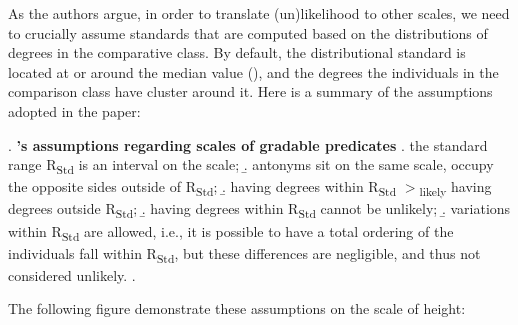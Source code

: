 \documentclass[12pt,letterpaper]{scrartcl}
\newcommand{\sub}[1]{\textsubscript{#1}}
\begin{document}
As the authors argue, in order to translate (un)likelihood to other scales, we need to crucially assume standards that are computed based on the distributions of degrees in the comparative class. By default, the distributional standard is located at or around the median value (\cite{solt_notes_2011}), and the degrees the individuals in the comparison class have cluster around it. Here is a summary of the assumptions adopted in the paper:

\ex.\label{DG_assumptions} \textbf{\cite{daniels_even_2020}'s assumptions regarding scales of gradable predicates}
\a. the standard range R\sub{Std} is an interval on the scale;
\b. antonyms sit on the same scale, occupy the opposite sides outside of R\sub{Std};
\b. having degrees within R\sub{Std} $>$\sub{likely} having degrees outside R\sub{Std};
\b. having degrees within R\sub{Std} cannot be unlikely;
\b.\label{averagevariations} variations within R\sub{Std} are allowed, i.e., it is possible to have a total ordering of the individuals fall within R\sub{Std}, but these differences are negligible, and thus not considered unlikely. 
\z.

The following figure demonstrate these assumptions on the scale of height:
\end{document}
